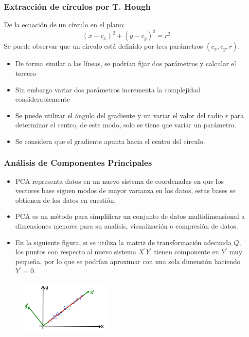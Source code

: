 \begin{frame}\frametitle{Extracción de círculos por T. Hough}
  De la ecuación de un círculo en el plano:
  \[(x - c_x)^2 + (y - c_y)^2 = r^2\]
  Se puede observar que un círculo está definido por tres parámetros $(c_x, c_y, r)$.
  \begin{itemize}
  \item De forma similar a las líneas, se podrían fijar dos parámetros y calcular el tercero
  \item Sin embargo variar dos parámetros incrementa la complejidad considerablemente
  \item Se puede utilizar el ángulo del gradiente y un variar el valor del radio $r$ para determinar el centro, de este modo, solo se tiene que variar un parámetro.
  \item Se considera que el gradiente apunta hacia el centro del círculo. 
  \end{itemize}
\end{frame}

\begin{frame}\frametitle{Análisis de Componentes Principales}
  \begin{itemize}
    \item PCA representa datos en un nuevo sistema de coordenadas en que los vectores base siguen modos de mayor varianza en los datos, estas bases se
      obtienen de los datos en cuestión.
    \item PCA es un método para simplificar un conjunto de datos multidimensional a dimensiones menores para su analísis, visualización o compresión de
      datos.
      \item En la siguiente figura, si se utiliza la matriz de transformación adecuada $Q$, los puntos con respecto al nuevo sistema $X^\prime Y^\prime$ tienen componente en $Y^\prime$ muy pequeña, por lo que se podrían aproximar con una sola dimensión haciendo $Y^\prime = 0$. 
\end{itemize}
\begin{figure}
  \centering
  \includegraphics[width=0.4\textwidth]{Figures/PCA1.png}
\end{figure}
\end{frame}

